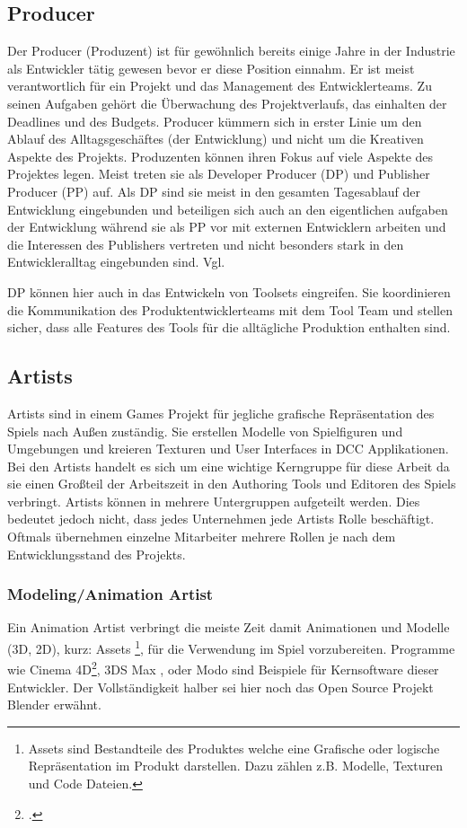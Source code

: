 \documentclass[pagesize, paper=a4, fontsize=12pt, titlepage=true, headings=small, headnosepline, abstractoff, liststotoc, nochapterprefix, plainheadsepline, twoside]{scrreprt}
\begin{document}
\subsection{Producer}
Der Producer (Produzent) ist für gewöhnlich bereits einige Jahre in der Industrie als Entwickler tätig gewesen bevor er diese Position einnahm. Er ist meist verantwortlich für ein Projekt und das Management des Entwicklerteams. Zu seinen Aufgaben gehört die Überwachung des Projektverlaufs, das einhalten der Deadlines und des Budgets. Producer kümmern sich in erster Linie um den Ablauf des Alltagsgeschäftes (der Entwicklung) und nicht um die Kreativen Aspekte des Projekts. Produzenten können ihren Fokus auf viele Aspekte des Projektes legen. Meist treten sie als Developer Producer (DP) und Publisher Producer (PP) auf. Als DP sind sie meist in den gesamten Tagesablauf der Entwicklung eingebunden und beteiligen sich auch an den eigentlichen aufgaben der Entwicklung während sie als PP vor mit externen Entwicklern arbeiten und die Interessen des Publishers vertreten und nicht besonders stark in den Entwickleralltag eingebunden sind. Vgl. 

DP können hier auch in das Entwickeln von Toolsets eingreifen. Sie koordinieren die Kommunikation des Produktentwicklerteams mit dem Tool Team und stellen sicher, dass alle Features des Tools für die alltägliche Produktion enthalten sind.

\subsection{Artists}
Artists sind in einem Games Projekt für jegliche grafische Repräsentation des Spiels nach Außen zuständig. Sie erstellen Modelle von Spielfiguren und Umgebungen und kreieren Texturen und User Interfaces in DCC Applikationen. Bei den Artists handelt es sich um eine wichtige Kerngruppe für diese Arbeit da sie einen Großteil der Arbeitszeit in den Authoring Tools und Editoren des Spiels verbringt. Artists können in mehrere Untergruppen aufgeteilt werden. Dies bedeutet jedoch nicht, dass jedes Unternehmen jede Artists Rolle beschäftigt. Oftmals übernehmen einzelne Mitarbeiter mehrere Rollen je nach dem Entwicklungsstand des Projekts.

\subsubsection{Modeling/Animation Artist}
Ein Animation Artist verbringt die meiste Zeit damit Animationen und Modelle (3D, 2D), kurz: Assets \footnote{Assets sind Bestandteile des Produktes welche eine Grafische oder logische Repräsentation im Produkt darstellen. Dazu zählen z.B. Modelle, Texturen und Code Dateien.}, für die Verwendung im Spiel vorzubereiten. Programme wie Cinema 4D\footcite{MaxonC4d2014}, 3DS Max \parencite{AutodeskMax2014}, oder Modo\parencite{FoundryModo2014} sind Beispiele für Kernsoftware dieser Entwickler. Der Vollständigkeit halber sei hier noch das Open Source Projekt Blender \parencite{Blender2015} erwähnt.
\end{document}
